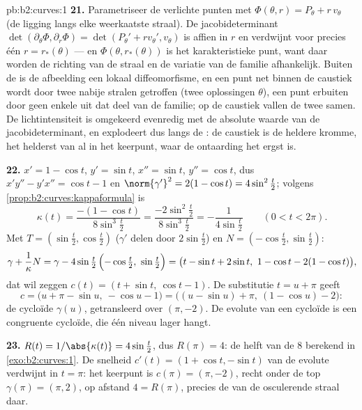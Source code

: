 \begin{solution}{pb:b2:curves:1}
\textbf{21.} Parametriseer de verlichte punten met $\Phi(\theta, r)
= P_\theta + r\,v_\theta$ (de ligging langs elke weerkaatste
straal). De jacobideterminant $\det(\partial_\theta\Phi,
\partial_r\Phi) = \det(P_\theta' + rv_\theta', v_\theta)$ is affien
in $r$ en verdwijnt voor precies één $r = r_*(\theta)$ --- en
$\Phi(\theta, r_*(\theta))$ is het karakteristieke punt, want daar
worden de richting van de straal en de variatie van de familie
afhankelijk. Buiten de  is de afbeelding een lokaal
diffeomorfisme, en een punt net binnen de caustiek wordt door twee
nabije stralen getroffen (twee oplossingen $\theta$), een punt
erbuiten door geen enkele uit dat deel van de familie; op de
caustiek vallen de twee samen. De lichtintensiteit is omgekeerd
evenredig met de absolute waarde van de jacobideterminant, en
explodeert dus langs de : de caustiek is de heldere
kromme, het helderst van al in het keerpunt, waar de ontaarding het
ergst is.

\textbf{22.} $x' = 1 - \cos t$, $y' = \sin t$, $x'' = \sin t$, $y''
= \cos t$, dus $x'y'' - y'x'' = \cos t - 1$ en $\norm{\gamma'}^2 =
2(1 - \cos t) = 4\sin^2\tfrac t2$; volgens
\cref{prop:b2:curves:kappaformula} is
\[
\kappa(t) = \frac{-(1 - \cos t)}{8\sin^3\tfrac t2}
= \frac{-2\sin^2\tfrac t2}{8\sin^3\tfrac t2}
= -\frac1{4\sin\tfrac t2}
\qquad (0 < t < 2\pi).
\]
Met $T = (\sin\tfrac t2, \cos\tfrac t2)$ ($\gamma'$ delen door
$2\sin\tfrac t2$) en $N = (-\cos\tfrac t2, \sin\tfrac t2)$:
\[
\gamma + \frac1\kappa N
= \gamma - 4\sin\tfrac t2\,\Bigl(-\cos\tfrac t2,\
\sin\tfrac t2\Bigr)
= \bigl(t - \sin t + 2\sin t,\ 1 - \cos t - 2(1 - \cos
t)\bigr),
\]
dat wil zeggen $c(t) = (t + \sin t,\ \cos t - 1)$. De substitutie
$t = u + \pi$ geeft
\[
c = \bigl(u + \pi - \sin u,\ -\cos u - 1\bigr)
= \bigl((u - \sin u) + \pi,\ (1 - \cos u) - 2\bigr) :
\]
de cycloïde $\gamma(u)$, getransleerd over $(\pi, -2)$. De evolute
van een cycloïde is een congruente cycloïde, die één niveau lager
hangt.

\textbf{23.} $R(t) = 1/\abs{\kappa(t)} = 4\sin\tfrac t2$, dus
$R(\pi) = 4$: de helft van de  $8$ berekend in
\cref{exo:b2:curves:1}. De snelheid $c'(t) = (1 + \cos t, -\sin t)$
van de evolute verdwijnt in $t = \pi$: het keerpunt is $c(\pi) =
(\pi, -2)$, recht onder de top $\gamma(\pi) = (\pi, 2)$, op afstand
$4 = R(\pi)$, precies de \omterm{def:b2:curves:length}{lengte} van de osculerende straal daar.


\end{solution}
